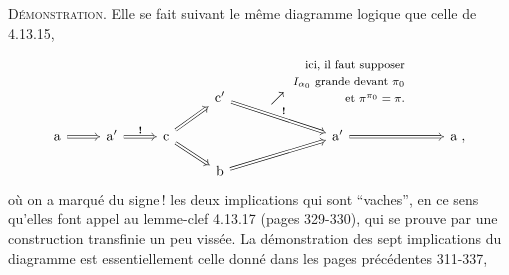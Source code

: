 \documentclass[11pt]{article}
\begin{document}
\textsc{Démonstration}. Elle se fait suivant le même diagramme logique que celle de 4.13.15,
\[
\begin{tikzcd}[row sep=small]
& & & \mathrm{c}' \arrow[dr, Rightarrow, "\textbf{!}"] & \nearrow\ \begin{tabular}[b]{@{}r@{}}\footnotesize ici, il faut supposer\\ \footnotesize $I_{\alpha_0}$ grande devant $\pi_0$\\ \footnotesize et $\pi^{\pi_0} = \pi$.\end{tabular} & \\
\mathrm{a} \arrow[r, Rightarrow] & \mathrm{a}' \arrow[r, Rightarrow, "\textbf{!}"] & \mathrm{c} \arrow[ur, Rightarrow] \arrow[dr, Rightarrow] & & \mathrm{a}' \arrow[r, Rightarrow] & \mathrm{a} \; , \\
& & & \mathrm{b} \arrow[ur, Rightarrow] & &
\end{tikzcd}
\]
où on a marqué du signe\,! les deux implications qui sont ``vaches'', en ce sens qu'elles font appel au lemme-clef 4.13.17 (pages 329-330), qui se prouve par une construction transfinie un peu vissée. La démonstration des sept implications du diagramme est essentiellement
celle donné dans les pages précédentes 311-337, %
\end{document}
